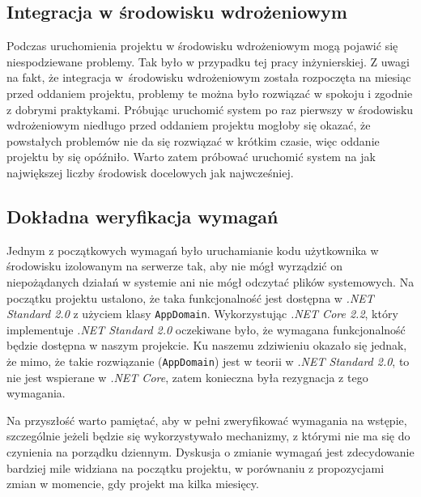 \documentclass[a4paper,11pt,twoside]{report}
\theoremstyle{definition}
\begin{document}
        \subsection{Integracja w środowisku wdrożeniowym}
            Podczas uruchomienia projektu w środowisku wdrożeniowym mogą pojawić się niespodziewane problemy. Tak było w przypadku tej pracy inżynierskiej. Z uwagi na fakt, że integracja w~środowisku wdrożeniowym została rozpoczęta na miesiąc przed oddaniem projektu, problemy te można było rozwiązać w spokoju i zgodnie z dobrymi praktykami.
            Próbując uruchomić system po raz pierwszy w środowisku wdrożeniowym niedługo przed oddaniem projektu mogłoby się okazać, że powstałych problemów nie da się rozwiązać w krótkim czasie, więc oddanie projektu by się opóźniło.
            Warto zatem próbować uruchomić system na jak największej liczby środowisk docelowych jak najwcześniej.
            
        \subsection{Dokładna weryfikacja wymagań}
            Jednym z początkowych wymagań było uruchamianie kodu użytkownika w środowisku izolowanym na serwerze tak, aby nie mógł wyrządzić on niepożądanych działań w systemie ani nie mógł odczytać plików systemowych.
            Na początku projektu ustalono, że taka funkcjonalność jest dostępna w {\textit{.NET Standard 2.0}} z użyciem klasy {\texttt{AppDomain}}. Wykorzystując {\textit{.NET Core 2.2}}, który implementuje {\textit{.NET Standard 2.0}} oczekiwane było, że wymagana funkcjonalność będzie dostępna w naszym projekcie.
            Ku naszemu zdziwieniu okazało się jednak, że mimo, że takie rozwiązanie ({\texttt{AppDomain}}) jest w teorii w {\textit{.NET Standard 2.0}}, to nie jest wspierane w {\textit{.NET Core}}, zatem konieczna była rezygnacja z tego wymagania.
            
            Na przyszłość warto pamiętać, aby w pełni zweryfikować wymagania na wstępie, szczególnie jeżeli będzie się wykorzystywało mechanizmy, z którymi nie ma się do czynienia na porządku dziennym. Dyskusja o zmianie wymagań jest zdecydowanie bardziej mile widziana na początku projektu, w porównaniu z propozycjami zmian w momencie, gdy projekt ma kilka miesięcy.
        
\end{document}
